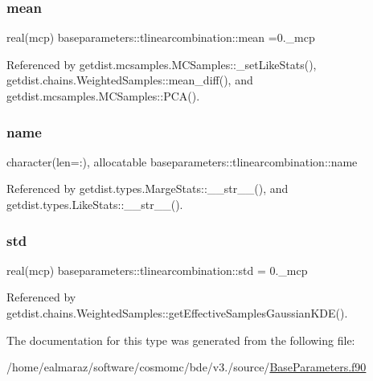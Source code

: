 \subsubsection{\texorpdfstring{mean}{mean}}
{\footnotesize\ttfamily real(mcp) baseparameters\+::tlinearcombination\+::mean =0.\+\_\+mcp\hspace{0.3cm}{\ttfamily [private]}}



Referenced by getdist.\+mcsamples.\+M\+C\+Samples\+::\+\_\+set\+Like\+Stats(), getdist.\+chains.\+Weighted\+Samples\+::mean\+\_\+diff(), and getdist.\+mcsamples.\+M\+C\+Samples\+::\+P\+C\+A().

\mbox{\label{structbaseparameters_1_1tlinearcombination_aa9a9ba3d0c13c57bee63cbb0dd8532e4}} 
\subsubsection{\texorpdfstring{name}{name}}
{\footnotesize\ttfamily character(len=\+:), allocatable baseparameters\+::tlinearcombination\+::name\hspace{0.3cm}{\ttfamily [private]}}



Referenced by getdist.\+types.\+Marge\+Stats\+::\+\_\+\+\_\+str\+\_\+\+\_\+(), and getdist.\+types.\+Like\+Stats\+::\+\_\+\+\_\+str\+\_\+\+\_\+().

\mbox{\label{structbaseparameters_1_1tlinearcombination_aacb01ad751251b105591f8d50164e1a2}} 
\subsubsection{\texorpdfstring{std}{std}}
{\footnotesize\ttfamily real(mcp) baseparameters\+::tlinearcombination\+::std = 0.\+\_\+mcp\hspace{0.3cm}{\ttfamily [private]}}



Referenced by getdist.\+chains.\+Weighted\+Samples\+::get\+Effective\+Samples\+Gaussian\+K\+D\+E().



The documentation for this type was generated from the following file\+:\begin{DoxyCompactItemize}
\item 
/home/ealmaraz/software/cosmomc/bde/v3./source/\mbox{\hyperlink{BaseParameters_8f90}{Base\+Parameters.\+f90}}\end{DoxyCompactItemize}
